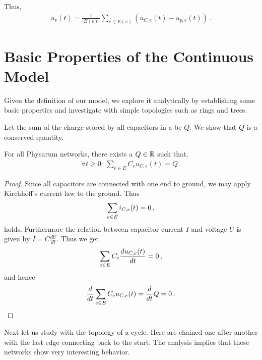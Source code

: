 Thus,
\begin{align}
  u_v(t) = \frac{1}{|E(v)|}\sum_{e \in E(v)}(u_{C,e}(t)-u_{p,e}(t))\,.\label{eq:uv}
\end{align}


\section{Basic Properties of the Continuous Model}\label{sec:basic_cont}

  Given the definition of our model, we explore it analytically by establishing some basic properties and investigate \Pns with simple topologies such as rings and trees.

  Let the sum of the charge stored by all capacitors in a \Pn be $Q$. We show that $Q$ is a conserved quantity.

\begin{lem}\label{lem:inv_cont}
For all Physarum networks, there exists a $Q \in \mathbb{R}$ such that,
\begin{align}
\forall t\ge 0:\,\sum_{e \in E}C_e u_{C,e}(t) = Q\,.
\end{align}
\end{lem}

\begin{proof}
Since all capacitors are connected with one end to ground, we may apply Kirchhoff's current law to the ground.
Thus  
\begin{align}
\sum_{e \in E}i_{C,e}(t) = 0\,,\notag
\end{align}
holds. Furthermore the relation between capacitor current $I$ and voltage $U$ is given by $I= C \frac{dU}{dt}$. Thus we get
\begin{align}
\sum_{e \in E}C_e\frac{du_{C,e}(t)}{dt} = 0\,,\notag
\end{align}
and hence
\begin{align}
\frac{d}{dt}\sum_{e \in E}C_eu_{C,e}(t) = \frac{d}{dt} Q = 0\,.\notag
\end{align}
\end{proof}

Next let us study \Pns with the topology of a cycle. Here \Pes are chained one after another with the last edge connecting back to the start. The analysis implies that these networks show very interesting behavior. 

